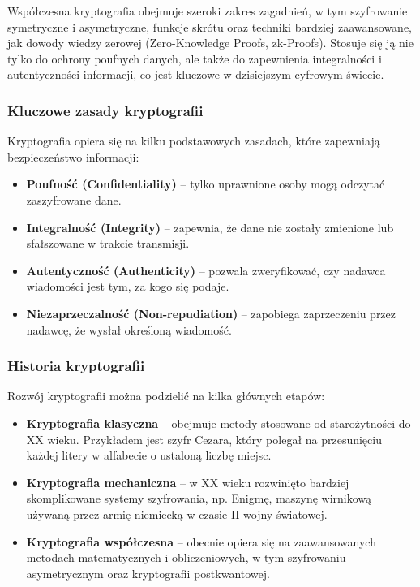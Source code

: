 \documentclass{article}
\begin{document}
Współczesna kryptografia obejmuje szeroki zakres zagadnień, w tym szyfrowanie symetryczne i asymetryczne, 
funkcje skrótu oraz techniki bardziej zaawansowane, jak dowody wiedzy zerowej (Zero-Knowledge Proofs, zk-Proofs). 
Stosuje się ją nie tylko do ochrony poufnych danych, ale także do zapewnienia integralności i autentyczności informacji, 
co jest kluczowe w dzisiejszym cyfrowym świecie.

\subsubsection{Kluczowe zasady kryptografii}
Kryptografia opiera się na kilku podstawowych zasadach, które zapewniają bezpieczeństwo informacji:

\begin{itemize}
    \item \textbf{Poufność (Confidentiality)} – tylko uprawnione osoby mogą odczytać zaszyfrowane dane.
    \item \textbf{Integralność (Integrity)} – zapewnia, że dane nie zostały zmienione lub sfałszowane w trakcie transmisji.
    \item \textbf{Autentyczność (Authenticity)} – pozwala zweryfikować, czy nadawca wiadomości jest tym, za kogo się podaje.
    \item \textbf{Niezaprzeczalność (Non-repudiation)} – zapobiega zaprzeczeniu przez nadawcę, że wysłał określoną wiadomość.
\end{itemize}

\subsubsection{Historia kryptografii}
Rozwój kryptografii można podzielić na kilka głównych etapów:

\begin{itemize}
    \item \textbf{Kryptografia klasyczna} – obejmuje metody stosowane od starożytności do XX wieku. Przykładem jest szyfr Cezara, 
    który polegał na przesunięciu każdej litery w alfabecie o ustaloną liczbę miejsc.
    \item \textbf{Kryptografia mechaniczna} – w XX wieku rozwinięto bardziej skomplikowane systemy szyfrowania, 
    np. Enigmę, maszynę wirnikową używaną przez armię niemiecką w czasie II wojny światowej.
    \item \textbf{Kryptografia współczesna} – obecnie opiera się na zaawansowanych metodach matematycznych i obliczeniowych, 
    w tym szyfrowaniu asymetrycznym oraz kryptografii postkwantowej.
\end{itemize}
\end{document}
